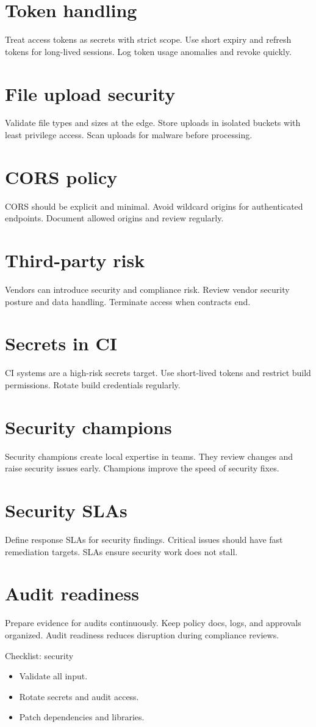 \section{Token handling}
Treat access tokens as secrets with strict scope.
Use short expiry and refresh tokens for long-lived sessions.
Log token usage anomalies and revoke quickly.

\section{File upload security}
Validate file types and sizes at the edge.
Store uploads in isolated buckets with least privilege access.
Scan uploads for malware before processing.

\section{CORS policy}
CORS should be explicit and minimal.
Avoid wildcard origins for authenticated endpoints.
Document allowed origins and review regularly.

\section{Third-party risk}
Vendors can introduce security and compliance risk.
Review vendor security posture and data handling.
Terminate access when contracts end.

\section{Secrets in CI}
CI systems are a high-risk secrets target.
Use short-lived tokens and restrict build permissions.
Rotate build credentials regularly.

\section{Security champions}
Security champions create local expertise in teams.
They review changes and raise security issues early.
Champions improve the speed of security fixes.

\section{Security SLAs}
Define response SLAs for security findings.
Critical issues should have fast remediation targets.
SLAs ensure security work does not stall.

\section{Audit readiness}
Prepare evidence for audits continuously.
Keep policy docs, logs, and approvals organized.
Audit readiness reduces disruption during compliance reviews.

\begin{checklistbox}{Checklist: security}
\begin{itemize}[nosep]
  \item Validate all input.
  \item Rotate secrets and audit access.
  \item Patch dependencies and libraries.
\end{itemize}
\end{checklistbox}
